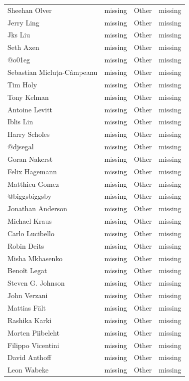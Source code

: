 \begin{longtable}{p{4cm}p{4cm}ll}
  Sheehan Olver & missing & Other & missing \\
  Jerry Ling & missing & Other & missing \\
  Jks Liu & missing & Other & missing \\
  Seth Axen & missing & Other & missing \\
  @o01eg & missing & Other & missing \\
  Sebastian Micluța-Câmpeanu & missing & Other & missing \\
  Tim Holy & missing & Other & missing \\
  Tony Kelman & missing & Other & missing \\
  Antoine Levitt & missing & Other & missing \\
  Iblis Lin & missing & Other & missing \\
  Harry Scholes & missing & Other & missing \\
  @djsegal & missing & Other & missing \\
  Goran Nakerst & missing & Other & missing \\
  Felix Hagemann & missing & Other & missing \\
  Matthieu Gomez & missing & Other & missing \\
  @biggsbiggsby & missing & Other & missing \\
  Jonathan Anderson & missing & Other & missing \\
  Michael Kraus & missing & Other & missing \\
  Carlo Lucibello & missing & Other & missing \\
  Robin Deits & missing & Other & missing \\
  Misha Mkhasenko & missing & Other & missing \\
  Benoît Legat & missing & Other & missing \\
  Steven G. Johnson & missing & Other & missing \\
  John Verzani & missing & Other & missing \\
  Mattias Fält & missing & Other & missing \\
  Rashika Karki & missing & Other & missing \\
  Morten Piibeleht & missing & Other & missing \\
  Filippo Vicentini & missing & Other & missing \\
  David Anthoff & missing & Other & missing \\
  Leon Wabeke & missing & Other & missing \\

\end{longtable}

